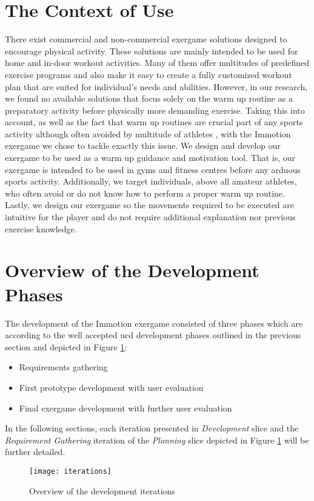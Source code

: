 \section{The Context of Use}
There exist commercial and non-commercial exergame solutions designed to encourage physical activity. These solutions are mainly intended to be used for home and in-door workout activities. Many of them offer multitudes of predefined exercise programs and also make it easy to create a fully customized workout plan that are suited for individual's needs and abilities. However, in our research, we found no available solutions that focus solely on the warm up routine as a preparatory activity before physically more demanding exercise. Taking this into account, as well as the fact that warm up routines are crucial part of any sports activity \cite{bishop2003warm1,shellock1985warming} although often avoided by multitude of athletes \cite{fradkin2006does}, with the Immotion exergame we chose to tackle exactly this issue. We design and develop our exergame to be used as a warm up guidance and motivation tool. That is, our exergame is intended to be used in gyms and fitness centres before any arduous sports activity. Additionally, we target individuals, above all amateur athletes, who often avoid or do not know how to perform a proper warm up routine. Lastly, we design our exergame so the movements required to be executed are intuitive for  the player and do not require additional explanation nor previous exercise knowledge. \pagebreak
\section{Overview of the Development Phases}
The development of the Immotion exergame consisted of three phases which are according to the well accepted \acrshort{ucd} development phases outlined in the previous section and depicted in Figure \ref{fig:iterations}: 
\begin{itemize}
\item Requirements gathering 
\item First prototype development with user evaluation
\item Final exergame development with further user evaluation
\end{itemize}
In the following sections, each iteration presented in \textit{Development} slice and the \textit{Requirement Gathering} iteration of the \textit{Planning} slice depicted in Figure \ref{fig:iterations} will be further detailed. 
\begin{figure}[h]
    \centering
    \texttt{[image: iterations]}
    \caption{Overview of the development iterations}
    \label{fig:iterations}
\end{figure}
